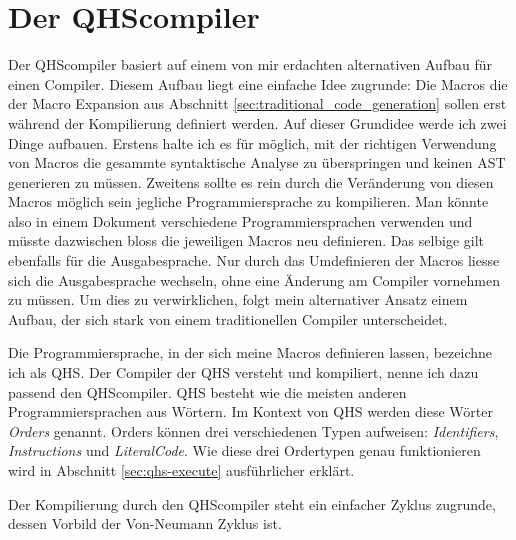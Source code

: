 \chapter{Der QHScompiler} \label{cha:4-QHS_Compiler}
Der QHScompiler basiert auf einem von mir erdachten alternativen Aufbau für einen Compiler. Diesem Aufbau liegt eine einfache Idee zugrunde:
Die Macros die der Macro Expansion aus Abschnitt \ref{sec:traditional_code_generation} sollen erst während der Kompilierung definiert werden. 
Auf dieser Grundidee werde ich zwei Dinge aufbauen. Erstens halte ich es für möglich, mit der richtigen Verwendung von Macros die gesammte syntaktische Analyse zu überspringen und keinen AST generieren zu müssen.
Zweitens sollte es rein durch die Veränderung von diesen Macros möglich sein jegliche Programmiersprache zu kompilieren. Man könnte also in einem Dokument verschiedene Programmiersprachen verwenden und
müsste dazwischen bloss die jeweiligen Macros neu definieren. Das selbige gilt ebenfalls für die Ausgabesprache.
Nur durch das Umdefinieren der Macros liesse sich die Ausgabesprache wechseln, ohne eine Änderung am Compiler vornehmen zu müssen.
Um dies zu verwirklichen, folgt mein alternativer Ansatz einem Aufbau, der sich stark von einem traditionellen Compiler unterscheidet.

Die Programmiersprache, in der sich meine Macros definieren lassen, bezeichne ich als QHS. Der Compiler der QHS versteht und kompiliert, nenne ich dazu passend den QHScompiler.
QHS besteht wie die meisten anderen Programmiersprachen aus Wörtern. Im Kontext von QHS werden diese Wörter \textit{Orders} genannt.
Orders können drei verschiedenen Typen aufweisen: \textit{Identifiers}, \textit{Instructions} und \textit{LiteralCode}.
Wie diese drei Ordertypen genau funktionieren wird in Abschnitt \ref{sec:qhs-execute} ausführlicher erklärt.

Der Kompilierung durch den QHScompiler steht ein einfacher Zyklus zugrunde, dessen Vorbild der Von-Neumann Zyklus ist.

